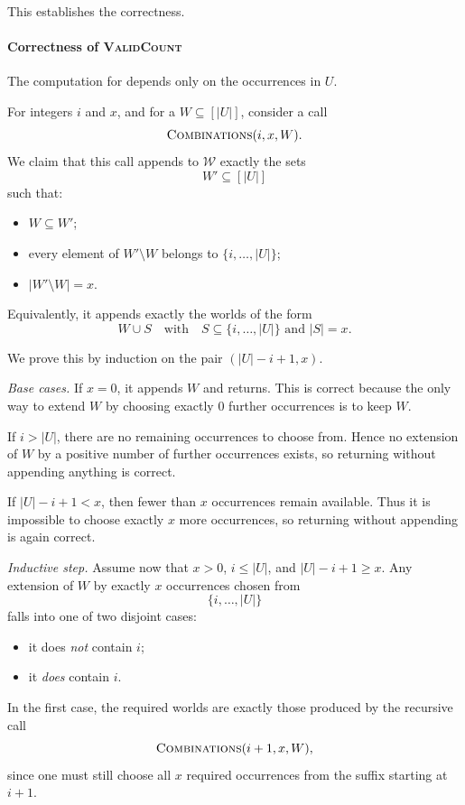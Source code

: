 \begin{appendixproof}
This establishes the correctness.

\paragraph*{Correctness of \textsc{ValidCount}}
The computation for  depends only on the occurrences in $U$.

For integers $i$ and $x$, and for a $W\subseteq [|U|]$, consider a call
\[
\textsc{Combinations}(i,x,W).
\]
We claim that this call appends to $\mathcal W$ exactly the sets
\[
  W'\subseteq [|U|]
\]
such that:
\begin{itemize}
\item $W\subseteq W'$;
\item every element of $W'\setminus W$ belongs to $\{i,\dots,|U|\}$;
\item $|W'\setminus W|=x$.
\end{itemize}
Equivalently, it appends exactly the worlds of the form
\[
W\cup S
\quad\text{with}\quad
S\subseteq \{i,\dots,|U|\}
\text{ and } |S|=x.
\]

We prove this by induction on the pair $(|U|-i+1,x)$.

\smallskip\noindent\emph{Base cases.}
If $x=0$, it appends $W$ and returns. This is correct because the only way to extend $W$ by choosing exactly $0$ further occurrences is to keep $W$.

If $i>|U|$, there are no remaining occurrences to choose from. Hence no extension of $W$ by a positive number of further occurrences exists, so returning without appending anything is correct.

If $|U|-i+1<x$, then fewer than $x$ occurrences remain available. Thus it is impossible to choose exactly $x$ more occurrences, so returning without appending is again correct.

\smallskip\noindent\emph{Inductive step.}
Assume now that $x>0$, $i\le |U|$, and $|U|-i+1\ge x$.
Any extension of $W$ by exactly $x$ occurrences chosen from
\[
\{i,\dots,|U|\}
\]
falls into one of two disjoint cases:
\begin{itemize}
\item it does \emph{not} contain $i$;
\item it \emph{does} contain $i$.
\end{itemize}

In the first case, the required worlds are exactly those produced by the recursive call
\[
\textsc{Combinations}(i+1,x,W),
\]
since one must still choose all $x$ required occurrences from the suffix starting at $i+1$.


\end{appendixproof}
